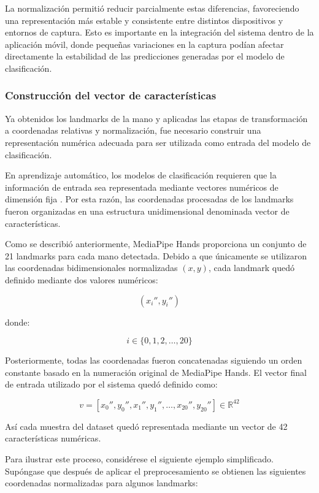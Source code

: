	La normalización permitió reducir parcialmente estas diferencias, favoreciendo
	una representación más estable y consistente entre distintos dispositivos y
	entornos de captura. Esto es importante en la integración
	del sistema dentro de la aplicación móvil, donde pequeñas variaciones en la
	captura podían afectar directamente la estabilidad de las predicciones generadas
	por el modelo de clasificación.
	
	\subsubsection{Construcción del vector de características}
	
	Ya obtenidos los landmarks de la mano y aplicadas las etapas de
	transformación a coordenadas relativas y normalización, fue necesario construir
	una representación numérica adecuada para ser utilizada como entrada del modelo
	de clasificación.
	
	En aprendizaje automático, los modelos de clasificación requieren que la
	información de entrada sea representada mediante vectores numéricos de dimensión
	fija \cite{goodfellow2016deep}. Por esta razón, las coordenadas procesadas de los
	landmarks fueron organizadas en una estructura unidimensional denominada vector
	de características.
	
	Como se describió anteriormente, MediaPipe Hands proporciona un conjunto de 21
	landmarks para cada mano detectada. Debido a que únicamente se utilizaron las
	coordenadas bidimensionales normalizadas $(x,y)$, cada landmark quedó definido
	mediante dos valores numéricos:
	
	\[
	(x_i'',y_i'')
	\]
	
	donde:
	
	\[
	i \in \{0,1,2,\dots,20\}
	\]
	
	Posteriormente, todas las coordenadas fueron concatenadas siguiendo un orden
	constante basado en la numeración original de MediaPipe Hands. El vector final de
	entrada utilizado por el sistema quedó definido como:
	
	\[
	v =
	[x_0'',y_0'',
	x_1'',y_1'',
	\ldots,
	x_{20}'',y_{20}'']
	\in \mathbb{R}^{42}
	\]
	
	Así cada muestra del dataset quedó representada mediante un vector de
	42 características numéricas.
	
	Para ilustrar este proceso, considérese el siguiente ejemplo simplificado.
	Supóngase que después de aplicar el preprocesamiento se obtienen las siguientes
	coordenadas normalizadas para algunos landmarks:
	
